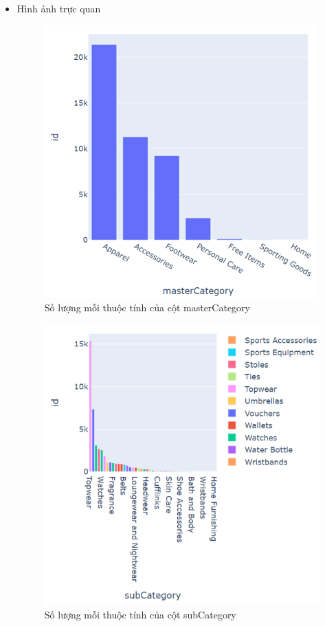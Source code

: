 \begin{itemize}
\begin{itemize}
        \item Hình ảnh trực quan
        \begin{center}
            \begin{figure}[!h]
                \centering
                \includegraphics[scale = 0.9]{fileanh/2.png}
                \caption{Số lượng mỗi thuộc tính của cột masterCategory}
            \end{figure}
        \end{center}
        \newpage
        \begin{center}
            \begin{figure}[!h]
                \centering
                \includegraphics[scale = 1]{fileanh/3.png}
                \caption{Số lượng mỗi thuộc tính của cột subCategory}
            \end{figure}
        \end{center}
        
    \end{itemize}
\end{itemize}

